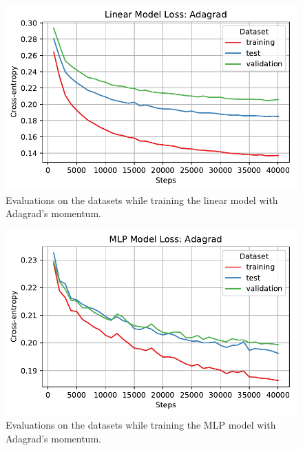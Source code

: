 \documentclass[letterpaper,11pt]{article}
\begin{document}
  \begin{figure}
    \centering
    \includegraphics{problem4/linear_loss_adagrad.pdf}
    \caption{Evaluations on the datasets while training the linear model with
      Adagrad's momentum.}
    \label{fig:linear_loss_adagrad}
  \end{figure}

    \begin{figure}
    \centering
    \includegraphics{problem4/mlp_loss_adagrad.pdf}
    \caption{Evaluations on the datasets while training the MLP model with
      Adagrad's momentum.}
    \label{fig:mlp_loss_adagrad}
  \end{figure}
\end{document}
